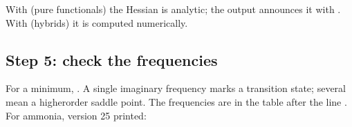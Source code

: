 \documentclass[letterpaper,10pt,english,openany,oneside]{sphinxmanual}
\begin{document}
\sphinxAtStartPar
With  (pure functionals) the Hessian is analytic; the output announces it with
. With  (hybrids) it is computed numerically.




\subsection{Step 5: check the frequencies}
\label{\detokenize{start/getting-started:step-5-check-the-frequencies}}
\sphinxAtStartPar
For a minimum, . A single imaginary frequency marks a transition state;
several mean a higher\sphinxhyphen{}order saddle point. The frequencies are in the table after the line .
For ammonia, version 25 printed:
\end{document}
